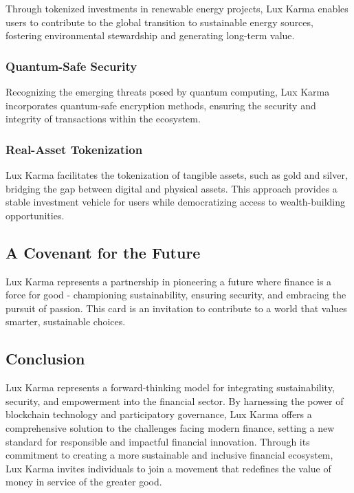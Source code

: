 \documentclass[11pt]{article}
\begin{document}
Through tokenized investments in renewable energy projects, Lux Karma enables users to contribute to the global transition to sustainable energy sources, fostering environmental stewardship and generating long-term value.


\subsubsection{Quantum-Safe Security}

Recognizing the emerging threats posed by quantum computing, Lux Karma incorporates quantum-safe encryption methods, ensuring the security and integrity of transactions within the ecosystem.


\subsubsection{Real-Asset Tokenization}

Lux Karma facilitates the tokenization of tangible assets, such as gold and silver, bridging the gap between digital and physical assets. This approach provides a stable investment vehicle for users while democratizing access to wealth-building opportunities.


\subsection{A Covenant for the Future}

Lux Karma represents a partnership in pioneering a future where finance is a force for good - championing sustainability, ensuring security, and embracing the pursuit of passion. This card is an invitation to contribute to a world that values smarter, sustainable choices.


\subsection{Conclusion}

Lux Karma represents a forward-thinking model for integrating sustainability, security, and empowerment into the financial sector. By harnessing the power of blockchain technology and participatory governance, Lux Karma offers a comprehensive solution to the challenges facing modern finance, setting a new standard for responsible and impactful financial innovation. Through its commitment to creating a more sustainable and inclusive financial ecosystem, Lux Karma invites individuals to join a movement that redefines the value of money in service of the greater good.
\end{document}
